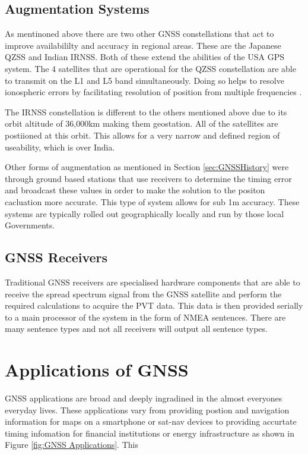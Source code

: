 \subsection{Augmentation Systems} \label{subsec:GNSS_OtherIntro}
As mentinoned above there are two other GNSS constellations that act to improve availabililty and accuracy in regional areas. These are the Japanese QZSS and Indian
IRNSS. Both of these extend the abilities of the USA GPS system. The 4 satellites that are operational for the QZSS constellation are able to transmit on the L1 and L5
band  simultaneously. Doing so helps to resolve ionospheric errors by facilitating resolution of position from multiple frequencies \cite{RN48}.

The IRNSS constellation is different to the others mentioned above due to its orbit altitude of 36,000km making them geostation. All of the satellites are postiioned at
this orbit. This allows for a very narrow and defined region of useability, which is over India. 

Other forms of augmentation as mentioned in Section \ref{sec:GNSSHistory} were through ground based stations that use receivers to determine the timing error and broadcast these
values in order to make the solution to the positon cacluation more accurate. This type of system allows for sub 1m accuracy. These systems are typically rolled out
geographically locally and run by those local Governments.

\subsection{GNSS Receivers}
Traditional GNSS receivers are specialised hardware components that are able to receive the spread spectrum signal from the GNSS satellite and perform the required
calculations to acquire the PVT data. This data is then provided serially to a main processor of the system in the form of NMEA sentences. There are many sentence types
and not all receivers will output all sentence types. 


\section{Applications of GNSS} \label{sec:ApplicationsGNSS}
GNSS applications are broad and deeply ingradined in the almost everyones everyday lives. These applications vary from providing postion and navigation information for
maps on a smartphone or sat-nav devices to providing accurtate timing infomation for financial institutions or energy infrastructure \cite{RN33} \cite{RN12} as shown in Figure
\ref{fig:GNSS Applications}. This 

